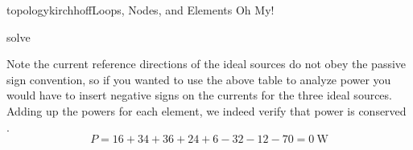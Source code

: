 \begin{mainquestion}{topologykirchhoff}{Loops, Nodes, and Elements Oh My!}
\begin{partquestion}{solve}
\begin{answer}
\begin{table}[htbp]
\end{table}

Note the current reference directions of the ideal sources do not obey the passive sign convention, so if you wanted to use the above table to analyze power you would have to insert negative signs on the currents for the three ideal sources. Adding up the powers for each element, we indeed verify that power is conserved
.
\[
P = 16 + 34 + 36 + 24 + 6 -32 - 12 - 70 = \qty{0}{\watt}
\]

\end{answer}
\end{partquestion}
\end{mainquestion}